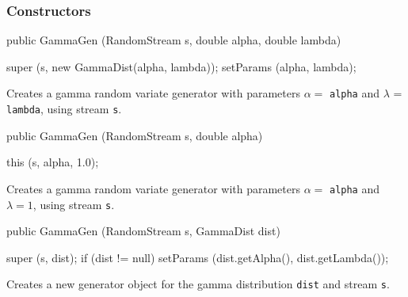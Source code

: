 \subsubsection* {Constructors}
\begin{code}

   public GammaGen (RandomStream s, double alpha, double lambda) \begin{hide} {
      super (s, new GammaDist(alpha, lambda));
      setParams (alpha, lambda);
   }\end{hide}
\end{code} 
\begin{tabb} Creates a gamma random variate generator with parameters
 $\alpha =$ \texttt{alpha} and $\lambda $ = \texttt{lambda},
  using stream \texttt{s}. 
\end{tabb}
\begin{code}

   public GammaGen (RandomStream s, double alpha) \begin{hide} {
      this (s, alpha, 1.0);
   }\end{hide}
\end{code} 
\begin{tabb} Creates a gamma random variate generator with parameters
 $\alpha =$ \texttt{alpha} and $\lambda = 1$, using stream \texttt{s}. 
\end{tabb}
\begin{code}
   
   public GammaGen (RandomStream s, GammaDist dist) \begin{hide} {
      super (s, dist);
      if (dist != null)
         setParams (dist.getAlpha(), dist.getLambda());
   }\end{hide}
\end{code}
\begin{tabb}  Creates a new generator object for the gamma
    distribution \texttt{dist} and stream \texttt{s}.
\end{tabb}

